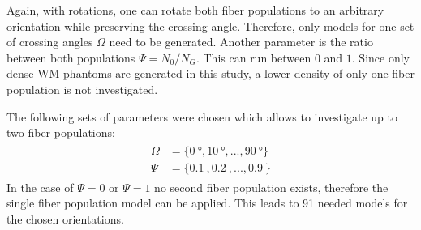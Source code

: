 Again, with rotations, one can rotate both fiber populations to an arbitrary orientation while preserving the crossing angle.
Therefore, only models for one set of crossing angles $\Omega$ need to be generated.
Another parameter is the ratio between both populations $\Psi=N_0/N_G$.
This can run between $0$ and $1$.
Since only dense \ac{WM} phantoms are generated in this study, a lower density of only one fiber population is not investigated.
\par
% 
The following sets of parameters were chosen which allows to investigate up to two fiber populations:
\begin{align}
    \begin{split}
        \Omega &= \{\SI{0}{\degree}, \SI{10}{\degree}, ..., \SI{90}{\degree}\}\\
        \Psi &= \{\SI{0.1}{}, \SI{0.2}{}, ..., \SI{0.9}{}\}
    \end{split}
\end{align}
In the case of $\Psi = 0$ or $\Psi = 1$ no second fiber population exists, therefore the single fiber population model can be applied.
This leads to 91 needed models for the chosen orientations.
% 
